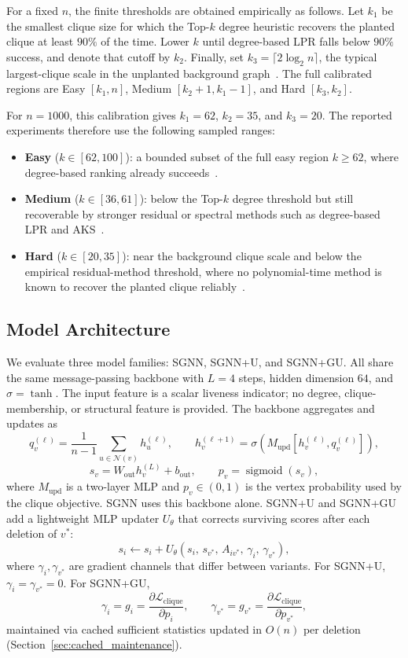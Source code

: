\documentclass[journal,article,submit,pdftex,moreauthors]{Definitions/mdpi}
\begin{document}
For a fixed $n$, the finite thresholds are obtained empirically as follows. Let
$k_1$ be the smallest clique size for which the Top-$k$ degree heuristic recovers
the planted clique at least $90\%$ of the time. Lower $k$ until degree-based LPR
falls below $90\%$ success, and denote that cutoff by $k_2$. Finally, set
$k_3=\lceil 2\log_2 n\rceil$, the typical largest-clique scale in the unplanted
background graph~\citep{bollobas1985}. The full calibrated regions are Easy
$[k_1,n]$, Medium $[k_2+1,k_1-1]$, and Hard $[k_3,k_2]$.

For $n=1000$, this calibration gives $k_1=62$, $k_2=35$, and $k_3=20$. The reported
experiments therefore use the following sampled ranges:
\begin{itemize}
  \item \textbf{Easy} ($k\in[62,100]$): a bounded subset of the full easy region
    $k\ge 62$, where degree-based ranking already succeeds~\citep{kucera1995}.
  \item \textbf{Medium} ($k\in[36,61]$): below the Top-$k$ degree threshold but
    still recoverable by stronger residual or spectral methods such
    as degree-based LPR and AKS~\citep{alon1998,feige2010}.
  \item \textbf{Hard} ($k\in[20,35]$): near the background clique scale and below
    the empirical residual-method threshold, where no polynomial-time method is
    known to recover the planted clique reliably~\citep{manurangsi2021}.
\end{itemize}

\subsection{Model Architecture}
\label{sec:architectures}

We evaluate three model families: SGNN, SGNN+U, and SGNN+GU. All share the same
message-passing backbone with $L=4$ steps, hidden dimension $64$, and
$\sigma=\tanh$. The input feature is a scalar liveness indicator; no degree,
clique-membership, or structural feature is provided. The backbone aggregates and
updates as
\[
  q_v^{(\ell)} = \frac{1}{n-1}\sum_{u\in\mathcal{N}(v)} h_u^{(\ell)},
  \qquad
  h_v^{(\ell+1)} = \sigma\!\left(M_{\mathrm{upd}}\!\left[h_v^{(\ell)},
  q_v^{(\ell)}\right]\right),
\]
\[
  s_v = W_{\mathrm{out}} h_v^{(L)} + b_{\mathrm{out}},
  \qquad
  p_v = \operatorname{sigmoid}(s_v),
\]
where $M_{\mathrm{upd}}$ is a two-layer MLP and $p_v \in (0,1)$ is the vertex
probability used by the clique objective. SGNN uses this backbone alone. SGNN+U and
SGNN+GU add a lightweight MLP updater $U_\theta$ that corrects surviving scores
after each deletion of $v^*$:
\[
  s_i \leftarrow s_i + U_\theta(s_i,\, s_{v^*},\, A_{iv^*},\, \gamma_i,\,
  \gamma_{v^*}),
\]
where $\gamma_i, \gamma_{v^*}$ are gradient channels that differ between variants.
For SGNN+U, $\gamma_i = \gamma_{v^*} = 0$. For SGNN+GU,
\[
  \gamma_i = g_i = \frac{\partial \mathcal{L}_{\mathrm{clique}}}{\partial p_i},
  \qquad
  \gamma_{v^*} = g_{v^*} = \frac{\partial \mathcal{L}_{\mathrm{clique}}}{\partial
  p_{v^*}},
\]
maintained via cached sufficient statistics updated in $O(n)$ per deletion
(Section~\ref{sec:cached_maintenance}).
\end{document}
